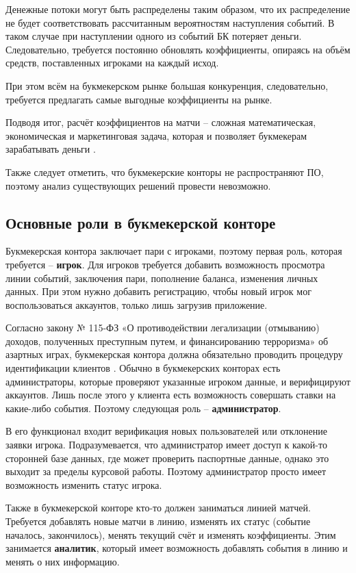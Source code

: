 Денежные потоки могут быть распределены таким образом, что их распределение не будет соответствовать рассчитанным вероятностям наступления событий. 
В таком случае при наступлении одного из событий БК потеряет деньги.
Следовательно, требуется постоянно обновлять коэффициенты, опираясь на объём средств, поставленных игроками на каждый исход.

При этом всём на букмекерском рынке большая конкуренция, следовательно, требуется предлагать самые выгодные коэффициенты на рынке.

Подводя итог, расчёт коэффициентов на матчи -- сложная математическая, экономическая и маркетинговая задача, которая и позволяет букмекерам зарабатывать деньги \cite{kfs}.

Также следует отметить, что букмекерские конторы не распространяют ПО, поэтому анализ существующих решений провести невозможно.

\subsection{Основные роли в букмекерской конторе}
Букмекерская контора заключает пари с игроками, поэтому первая роль, которая требуется -- \textbf{игрок}. 
Для игроков требуется добавить возможность просмотра линии событий, заключения пари, пополнение баланса, изменения личных данных.
При этом нужно добавить регистрацию, чтобы новый игрок мог воспользоваться аккаунтов, только лишь загрузив приложение. 

Согласно закону № 115-ФЗ «О противодействии легализации (отмыванию) доходов, полученных преступным путем, и финансированию терроризма» об азартных играх, букмекерская контора должна обязательно проводить процедуру идентификации клиентов \cite{bk2}. 
Обычно в букмекерских конторах есть администраторы, которые проверяют указанные игроком данные, и верифицируют аккаунтов. 
Лишь после этого у клиента есть возможность совершать ставки на какие-либо события.
Поэтому следующая роль -- \textbf{администратор}.

В его функционал входит верификация новых пользователей или отклонение заявки игрока.
Подразумевается, что администратор имеет доступ к какой-то сторонней базе данных, где может проверить паспортные данные, однако это выходит за пределы курсовой работы.
Поэтому администратор просто имеет возможность изменить статус игрока.

Также в букмекерской конторе кто-то должен заниматься линией матчей. 
Требуется добавлять новые матчи в линию, изменять их статус (событие началось, закончилось), менять текущий счёт и изменять коэффициенты.
Этим занимается \textbf{аналитик}, который имеет возможность добавлять события в линию и менять о них информацию.

